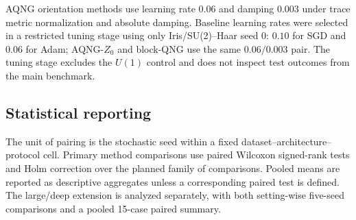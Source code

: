 AQNG orientation methods use learning rate $0.06$ and damping $0.003$ under trace metric normalization and absolute damping. Baseline learning rates were selected in a restricted tuning stage using only Iris/SU(2)--Haar seed 0: $0.10$ for SGD and $0.06$ for Adam; AQNG-$Z_0$ and block-QNG use the same $0.06/0.003$ pair. The tuning stage excludes the $U(1)$ control and does not inspect test outcomes from the main benchmark.

\subsection{Statistical reporting}
The unit of pairing is the stochastic seed within a fixed dataset--architecture--protocol cell. Primary method comparisons use paired Wilcoxon signed-rank tests and Holm correction over the planned family of comparisons. Pooled means are reported as descriptive aggregates unless a corresponding paired test is defined. The large/deep extension is analyzed separately, with both setting-wise five-seed comparisons and a pooled 15-case paired summary.
